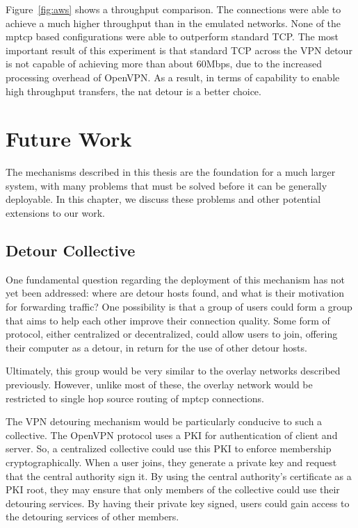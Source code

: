 \documentclass{cwru}
\begin{document}
Figure~\ref{fig:aws} shows a throughput comparison. The connections were able to
achieve a much higher throughput than in the emulated networks. None of the
\ac{mptcp} based configurations were able to outperform standard TCP. The most
important result of this experiment is that standard TCP across the VPN detour
is not capable of achieving more than about 60Mbps, due to the increased
processing overhead of OpenVPN. As a result, in terms of capability to enable
high throughput transfers, the \ac{nat} detour is a better choice.

\chapter{Future Work}
\label{c:fw}

The mechanisms described in this thesis are the foundation for a much larger
system, with many problems that must be solved before it can be generally
deployable. In this chapter, we discuss these problems and other potential
extensions to our work.

\section{Detour Collective}

One fundamental question regarding the deployment of this mechanism has not yet
been addressed: where are detour hosts found, and what is their motivation for
forwarding traffic? One possibility is that a group of users could form a group
that aims to help each other improve their connection quality. Some form of
protocol, either centralized or decentralized, could allow users to join,
offering their computer as a detour, in return for the use of other detour
hosts.

Ultimately, this group would be very similar to the overlay networks described
previously. However, unlike most of these, the overlay network would be
restricted to single hop source routing of \ac{mptcp} connections.

The VPN detouring mechanism would be particularly conducive to such a
collective. The OpenVPN protocol uses a PKI for authentication of client and
server. So, a centralized collective could use this PKI to enforce membership
cryptographically. When a user joins, they generate a private key and request
that the central authority sign it. By using the central authority's certificate
as a PKI root, they may ensure that only members of the collective could use
their detouring services. By having their private key signed, users could gain
access to the detouring services of other members.
\end{document}
